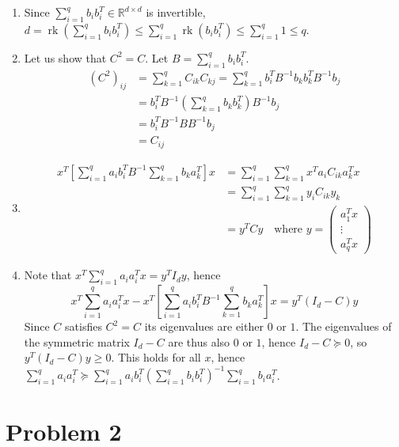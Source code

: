 \documentclass[a4paper,11pt]{article}
\DeclareMathOperator*{\rk}{rk}
\begin{document}
\begin{enumerate}
  \item Since $\sum_{i=1}^q b_i b_i^T\in \mathbb R^{d\times d}$ is invertible, $d=\rk\left(\sum_{i=1}^q b_i b_i^T\right) \leq \sum_{i=1}^q \rk(b_i b_i^T) \leq \sum_{i=1}^q 1 \leq q$.

  \item Let us show that $C^2=C$. Let $B =\sum_{i=1}^q b_i b_i^T$. 
  $$\begin{aligned}(C^2)_{ij} &= \sum_{k=1}^q C_{ik} C_{kj}
  = \sum_{k=1}^q b_i^T B^{-1} b_k b_k^T B^{-1} b_j\\
  &=  b_i^T B^{-1} \left(\sum_{k=1}^q b_k b_k^T\right) B^{-1} b_j \\
  &= b_i^T B^{-1} B B^{-1} b_j\\
  &= C_{ij}
  \end{aligned}
  $$

  \item $$\begin{aligned}
  x^T\left[\sum_{i=1}^q a_i b_i^T B^{-1} \sum_{k=1}^q b_k a_k^T\right]x &= \sum_{i=1}^q \sum_{k=1}^q x^Ta_i C_{ik} a_k^Tx\\
  &= \sum_{i=1}^q \sum_{k=1}^q y_i C_{ik} y_k\\
  &= y^T C y \quad \text{where } y=\begin{pmatrix}
    a_1^Tx \\ \vdots \\ a_q^Tx
  \end{pmatrix} 
  \end{aligned}
  $$

  \item Note that $x^T \sum_{i=1}^q a_i a_i^T x = y^T I_d y$, hence $$x^T \sum_{i=1}^q a_i a_i^T x - x^T\left[\sum_{i=1}^q a_i b_i^T B^{-1} \sum_{k=1}^q b_k a_k^T\right]x = y^T(I_d-C)y$$
  Since $C$ satisfies $C^2=C$ its eigenvalues are either $0$ or $1$. The eigenvalues of the symmetric matrix $I_d-C$ are thus also $0$ or $1$, hence $I_d-C\succeq 0$, so $y^T(I_d-C)y \geq 0$. This holds for all $x$, hence 
  $\sum_{i=1}^q a_i a_i^T \succeq \sum_{i=1}^q a_i b_i^T \left(\sum_{i=1}^q b_i b_i^T\right)^{-1} \sum_{i=1}^q b_i a_i^T$.
\end{enumerate}



\section*{Problem 2}
\end{document}
